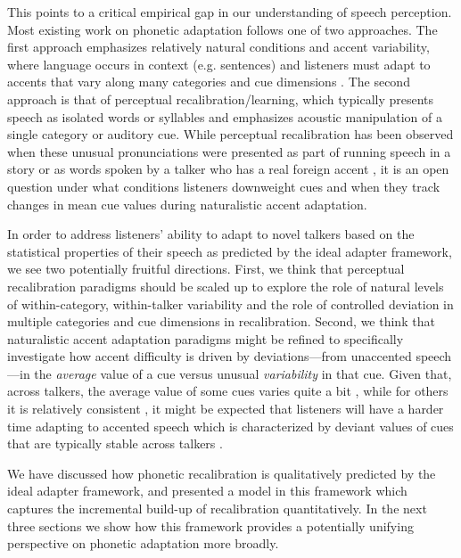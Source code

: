 This points to a critical empirical gap in our understanding of speech perception. Most existing work on phonetic adaptation follows one of two approaches. The first approach emphasizes relatively natural conditions and accent variability, where language occurs in context (e.g. sentences) and listeners must adapt to accents that vary along many categories and cue dimensions \autocite{Baese-berk2013,Bradlow2008,Clarke2004,Sidaras2009}.  The second approach is that of perceptual recalibration/learning, which typically presents speech as isolated words or syllables and emphasizes acoustic manipulation of a single category or auditory cue.  While perceptual recalibration has been observed when these unusual pronunciations were presented as part of running speech in a story \autocite{Eisner2006} or as words spoken by a talker who has a real foreign accent \autocite{Reinisch2014}, it is an open question under what conditions listeners downweight cues and when they track changes in mean cue values during naturalistic accent adaptation.

In order to address listeners' ability to adapt to novel talkers based on the statistical properties of their speech as predicted by the ideal adapter framework, we see two potentially fruitful directions.  First, we think that perceptual recalibration paradigms should be scaled up to explore the role of natural levels of within-category, within-talker variability and the role of controlled deviation in multiple categories and cue dimensions in recalibration.  Second, we think that naturalistic accent adaptation paradigms might be refined to specifically investigate how accent difficulty is driven by deviations---from unaccented speech---in the \emph{average} value of a cue versus unusual \emph{variability} in that cue.  Given that, across talkers, the average value of some cues varies quite a bit \autocite{Newman2001}, while for others it is relatively consistent \autocite{Allen2003}, it might be expected that listeners will have a harder time adapting to accented speech which is characterized by deviant values of cues that are typically stable across talkers \autocite[like VOT][]{Sumner2011}.

We have discussed how phonetic recalibration is qualitatively predicted by the ideal adapter framework, and presented a model in this framework which captures the incremental build-up of recalibration quantitatively.  In the next three sections we show how this framework provides a potentially unifying perspective on phonetic adaptation more broadly.



